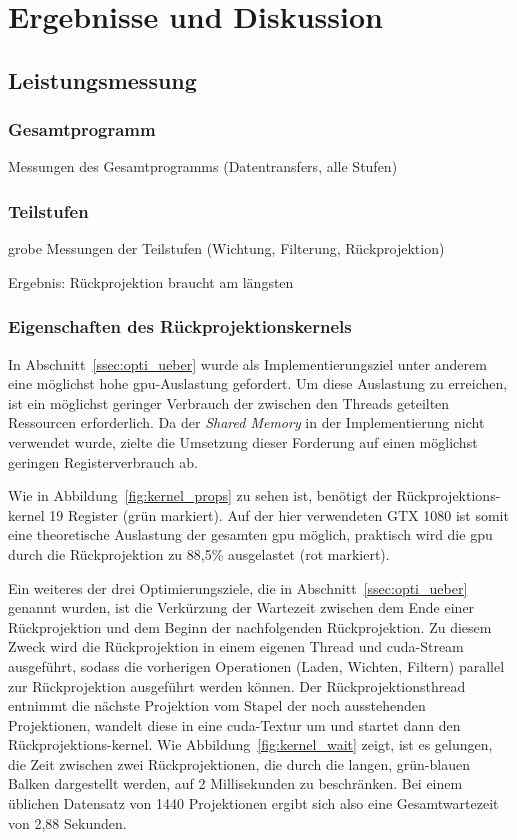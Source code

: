 \chapter{Ergebnisse und Diskussion}

\section{Leistungsmessung}

\subsection{Gesamtprogramm}

Messungen des Gesamtprogramms (Datentransfers, alle Stufen)

\subsection{Teilstufen}

grobe Messungen der Teilstufen (Wichtung, Filterung, Rückprojektion)

Ergebnis: Rückprojektion braucht am längsten

\subsection{Eigenschaften des Rückprojektionskernels}

In Abschnitt~\ref{ssec:opti_ueber} wurde als Implementierungsziel unter anderem eine möglichst hohe \gls{gpu}-Auslastung
gefordert. Um diese Auslastung zu erreichen, ist ein möglichst geringer Verbrauch der zwischen den Threads geteilten
Ressourcen erforderlich. Da der \textit{Shared Memory} in der Implementierung nicht verwendet wurde, zielte die
Umsetzung dieser Forderung auf einen möglichst geringen Registerverbrauch ab.

Wie in Abbildung~\ref{fig:kernel_props} zu sehen ist, benötigt der Rückprojektions-\gls{kernel} 19 Register
(grün markiert). Auf der hier verwendeten GTX 1080 ist somit eine theoretische Auslastung der gesamten \gls{gpu}
möglich, praktisch wird die \gls{gpu} durch die Rückprojektion zu 88,5\% ausgelastet (rot markiert).

Ein weiteres der drei Optimierungsziele, die in Abschnitt~\ref{ssec:opti_ueber} genannt wurden, ist die Verkürzung der
Wartezeit zwischen dem Ende einer Rückprojektion und dem Beginn der nachfolgenden Rückprojektion. Zu diesem Zweck wird
die Rückprojektion in einem eigenen Thread und \gls{cuda}-Stream ausgeführt, sodass die vorherigen Operationen (Laden,
Wichten, Filtern) parallel zur Rückprojektion ausgeführt werden können. Der Rückprojektionsthread entnimmt die nächste
Projektion vom Stapel der noch ausstehenden Projektionen, wandelt diese in eine \gls{cuda}-Textur um und startet dann
den Rückprojektions-\gls{kernel}. Wie Abbildung~\ref{fig:kernel_wait} zeigt, ist es gelungen, die Zeit zwischen zwei
Rückprojektionen, die durch die langen, grün-blauen Balken dargestellt werden, auf 2 Millisekunden zu beschränken. Bei
einem üblichen Datensatz von 1440 Projektionen ergibt sich also eine Gesamtwartezeit von 2,88 Sekunden.

